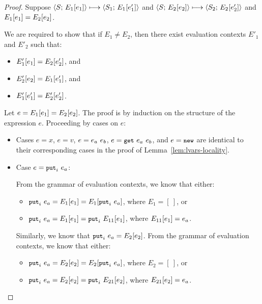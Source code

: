 \begin{proof}
  Suppose $\langle S;\, E_1\hspace{-0.5mm}\left[e_1\right] \rangle \longmapsto \langle S_1;\, E_1\hspace{-0.5mm}\left[e'_1\right] \rangle$ and
  $\langle S;\, E_2\hspace{-0.5mm}\left[e_2\right] \rangle \longmapsto
  \langle S_2;\, E_2\hspace{-0.5mm}\left[e'_2\right] \rangle$ and $E_1\hspace{-0.5mm}\left[e_1\right] =
  E_2\hspace{-0.5mm}\left[e_2\right]$.

  We are required to show that if $E_1 \neq E_2$, then there exist
  evaluation contexts $E'_1$ and $E'_2$ such that:
  \begin{itemize}
  \item $E'_1\hspace{-0.5mm}\left[e_1\right] = E_2\hspace{-0.5mm}\left[e'_2\right]$, and
  \item $E'_2\hspace{-0.5mm}\left[e_2\right] = E_1\hspace{-0.5mm}\left[e'_1\right]$, and
  \item $E'_1\hspace{-0.5mm}\left[e'_1\right] = E'_2\hspace{-0.5mm}\left[e'_2\right]$.
  \end{itemize}

  Let $e = E_1\hspace{-0.5mm}\left[e_1\right] = E_2\hspace{-0.5mm}\left[e_2\right]$.  The proof is
  by induction on the structure of the expression $e$.  Proceeding by
  cases on $e$:

  \begin{itemize}

    \item Cases $e = x$, $e = v$, $e = e_a~e_b$, $e = \mbox{\small{\texttt{get}}}~e_a~e_b$, and
      $e = \mbox{\small{\texttt{new}}}$ are identical to their corresponding cases in the proof
      of Lemma~\ref{lem:lvars-locality}.

    \item Case $e = \mbox{\small{\texttt{put}}}_i~e_a$:

      From the grammar of evaluation contexts, we know that either:
      \begin{itemize}
        \item $\mbox{\small{\texttt{put}}}_i~e_a = E_1\hspace{-0.5mm}\left[e_1\right] = E_1\hspace{-0.5mm}\left[\mbox{\small{\texttt{put}}}_i~e_a\right]$, where $E_1 = [~]$, or
        \item $\mbox{\small{\texttt{put}}}_i~e_a = E_1\hspace{-0.5mm}\left[e_1\right] =
          \mbox{\small{\texttt{put}}}_i~E_{11}\hspace{-0.5mm}\left[e_1\right]$, where
          $E_{11}\hspace{-0.5mm}\left[e_1\right] = e_a$.
      \end{itemize}

      Similarly, we know that $\mbox{\small{\texttt{put}}}_i~e_a = E_2\hspace{-0.5mm}\left[e_2\right]$.
      From the grammar of evaluation contexts, we know that either:
      \begin{itemize}
        \item $\mbox{\small{\texttt{put}}}_i~e_a = E_2\hspace{-0.5mm}\left[e_2\right] = E_2\hspace{-0.5mm}\left[\mbox{\small{\texttt{put}}}_i~e_a\right]$, where $E_2 = [~]$, or
        \item $\mbox{\small{\texttt{put}}}_i~e_a = E_2\hspace{-0.5mm}\left[e_2\right] =
          \mbox{\small{\texttt{put}}}_i~E_{21}\hspace{-0.5mm}\left[e_2\right]$, where
          $E_{21}\hspace{-0.5mm}\left[e_2\right] = e_a$.
      \end{itemize}


\end{itemize}
\end{proof}
